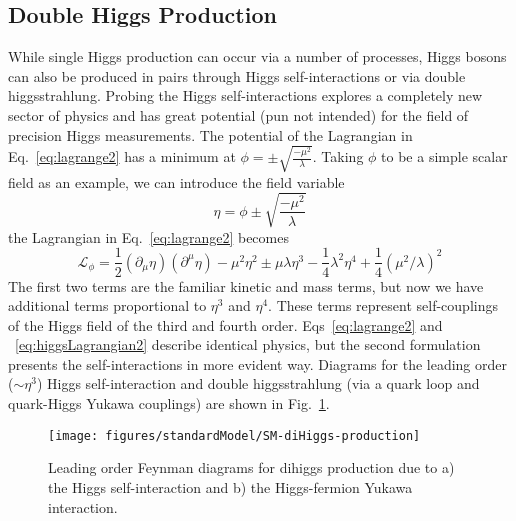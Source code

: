 \subsection{Double Higgs Production}
While single Higgs production can occur via a number of processes, Higgs bosons can also be produced in pairs through Higgs self-interactions or via double higgsstrahlung. Probing the Higgs self-interactions explores a completely new sector of physics and has great potential (pun not intended) for the field of precision Higgs measurements. The potential of the Lagrangian in Eq.~\ref{eq:lagrange2} has a minimum at $\phi = \pm \sqrt{\frac{-\mu^2}{\lambda}}$. Taking $\phi$ to be a simple scalar field as an example, we can introduce the field variable
\begin{equation}
\eta = \phi \pm \sqrt{\frac{-\mu^2}{\lambda}}
\end{equation}
the Lagrangian in Eq.~\ref{eq:lagrange2} becomes
\begin{equation}
\mathcal{L}_{\phi}=\frac{1}{2}\left(\partial_{\mu}\eta\right)\left(\partial^{\mu}\eta\right)-\mu^2\eta^2 \pm \mu\lambda\eta^3 - \frac{1}{4}\lambda^2\eta^4 + \frac{1}{4}(\mu^2/\lambda)^2
\label{eq:higgsLagrangian2}
\end{equation}
The first two terms are the familiar kinetic and mass terms, but now we have additional terms proportional to $\eta^3$ and $\eta^4$. These terms represent self-couplings of the Higgs field of the third and fourth order. Eqs~\ref{eq:lagrange2} and ~\ref{eq:higgsLagrangian2} describe identical physics, but the second formulation presents the self-interactions in more evident way. Diagrams for the leading order ($\sim\eta^3$) Higgs self-interaction and double higgsstrahlung (via a quark loop and quark-Higgs Yukawa couplings) are shown in Fig.~\ref{fig:SM-dihiggs-prod}.
\begin{figure}[h!]
\centering
\label{fig:SM-dihiggs-prod}
\texttt{[image: figures/standardModel/SM-diHiggs-production]}
\caption{Leading order Feynman diagrams for dihiggs production due to a) the Higgs self-interaction and b) the Higgs-fermion Yukawa interaction.}
\end{figure}


